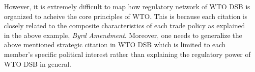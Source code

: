 However, it is extremely difficult to map how regulatory network of 
WTO DSB is organized to acheive the core principles of WTO. 
This is because 
each citation is closely related 
to the composite characteristics of each trade policy 
as explained in the above example, \textit{Byrd Amendment}. 
Moreover, one needs to generalize the above mentioned strategic 
citation in WTO DSB which is limited to each member's 
specific political interest rather than explaining the 
regulatory power of WTO DSB in general. 

